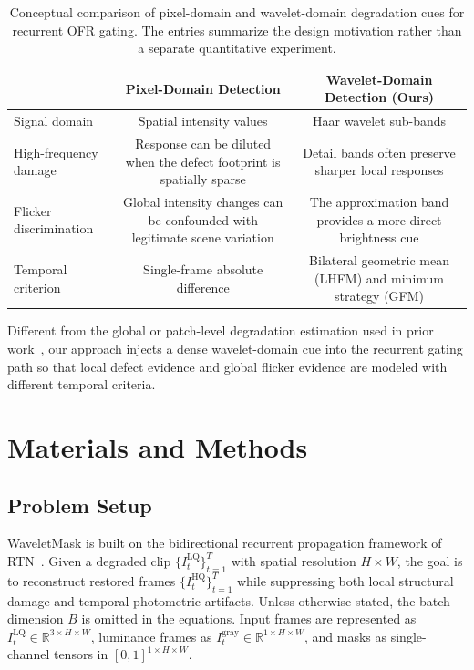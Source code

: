 {\begin{table}[H]
\caption{Conceptual comparison of pixel-domain and wavelet-domain degradation cues for recurrent OFR gating. The entries summarize the design motivation rather than a separate quantitative experiment.\label{tab:feature_comparison}}
\begin{tabularx}{\textwidth}{lCC}
\toprule
& \textbf{Pixel-Domain Detection} & \textbf{Wavelet-Domain Detection (Ours)} \\
\midrule
Signal domain          & Spatial intensity values & Haar wavelet sub-bands \\
High-frequency damage  & Response can be diluted when the defect footprint is spatially sparse & Detail bands often preserve sharper local responses \\
Flicker discrimination & Global intensity changes can be confounded with legitimate scene variation & The approximation band provides a more direct brightness cue \\
Temporal criterion     & Single-frame absolute difference & Bilateral geometric mean (LHFM) and minimum strategy (GFM) \\
\bottomrule
\end{tabularx}
\end{table}

Different from the global or patch-level degradation estimation used in prior work~\cite{li2022airnet,potlapalli2023promptir,mao2025mambaofr}, our approach injects a dense wavelet-domain cue into the recurrent gating path so that local defect evidence and global flicker evidence are modeled with different temporal criteria.


\section{Materials and Methods}\label{sec:method}

\subsection{Problem Setup}\label{subsec:problem_setup}

WaveletMask is built on the bidirectional recurrent propagation framework of RTN~\cite{rtn2022}. Given a degraded clip $\{I_t^{\mathrm{LQ}}\}_{t=1}^{T}$ with spatial resolution $H\times W$, the goal is to reconstruct restored frames $\{I_t^{\mathrm{HQ}}\}_{t=1}^{T}$ while suppressing both local structural damage and temporal photometric artifacts. Unless otherwise stated, the batch dimension $B$ is omitted in the equations. Input frames are represented as $I_t^{\mathrm{LQ}}\in\mathbb{R}^{3\times H\times W}$, luminance frames as $I_t^{\mathrm{gray}}\in\mathbb{R}^{1\times H\times W}$, and masks as single-channel tensors in $[0,1]^{1\times H\times W}$.

}
